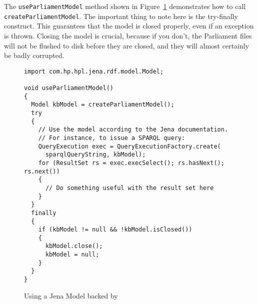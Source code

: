 The \verb|useParliamentModel| method shown in Figure~\ref{figure-using-jena-model} demonstrates how to call \verb|createParliamentModel|.  The important thing to note here is the try-finally construct.  This guarantees that the model is closed properly, even if an exception is thrown.  Closing the model is crucial, because if you don't, the Parliament files will not be flushed to disk before they are closed, and they will almost certainly be badly corrupted.

	\begin{figure}[htbp]
		\footnotesize
		\centering
		\begin{verbatim}
import com.hp.hpl.jena.rdf.model.Model;

void useParliamentModel()
{
  Model kbModel = createParliamentModel();
  try
  {
    // Use the model according to the Jena documentation.
    // For instance, to issue a SPARQL query:
    QueryExecution exec = QueryExecutionFactory.create(
      sparqlQueryString, kbModel);
    for (ResultSet rs = exec.execSelect(); rs.hasNext(); rs.next())
    {
      // Do something useful with the result set here
    }
  }
  finally
  {
    if (kbModel != null && !kbModel.isClosed())
    {
      kbModel.close();
      kbModel = null;
    }
  }
}
		\end{verbatim}
		\caption{Using a Jena Model backed by \protect\pmnt}
		\label{figure-using-jena-model}
	\end{figure}

